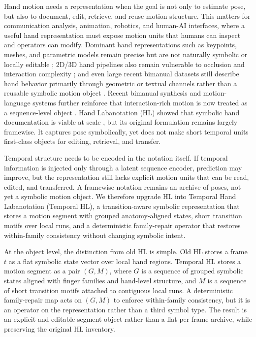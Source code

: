 \documentclass[letterpaper]{article}
\newcommand{\method}{Temporal Hand Labanotation}
\newcommand{\thl}{Temporal HL}
\begin{document}
Hand motion needs a representation when the goal is not only to estimate pose,
but also to document, edit, retrieve, and reuse motion structure. This matters
for communication analysis, animation, robotics, and human-AI interfaces, where
a useful hand representation must expose motion units that humans can inspect
and operators can modify. Dominant hand representations such as keypoints, meshes, and
parametric models remain precise but are not naturally symbolic or locally
editable \citep{romero2017mano}; 2D/3D hand pipelines also remain vulnerable to
occlusion and interaction complexity \citep{cao2021openpose, moon2020interhand};
and even large recent bimanual datasets still describe hand behavior primarily
through geometric or textual channels rather than a reusable symbolic motion
object \citep{fu2025gigahands}. Recent bimanual synthesis and motion-language
systems further reinforce that interaction-rich motion is now treated as a
sequence-level object \citep{chen2025language, zhang2025bimart}. Hand
Labanotation (HL) showed that symbolic hand documentation is viable at scale
\citep{li2024hl}, but its original formulation remains largely framewise. It
captures pose symbolically, yet does not make short temporal units first-class
objects for editing, retrieval, and transfer.

Temporal structure needs to be encoded in the notation itself. If
temporal information is injected only through a latent sequence encoder,
prediction may improve, but the representation still lacks explicit motion units
that can be read, edited, and transferred. A framewise notation remains an
archive of poses, not yet a symbolic motion object. We therefore upgrade HL into
\method{} (\thl{}), a transition-aware symbolic representation that stores a
motion segment with grouped anatomy-aligned states, short transition motifs over
local runs, and a deterministic family-repair operator that restores
within-family consistency without changing symbolic intent.

At the object level, the distinction from old HL is simple. Old HL stores a
frame $t$ as a flat symbolic state vector over local hand regions. \thl{}
stores a motion segment as a pair $(G, M)$, where $G$ is a sequence of grouped
symbolic states aligned with finger families and hand-level structure, and $M$
is a sequence of short transition motifs attached to contiguous local runs. A
deterministic family-repair map acts on $(G, M)$ to enforce within-family
consistency, but it is an operator on the representation rather than a third
symbol type. The result is an explicit and editable segment object rather than a
flat per-frame archive, while preserving the original HL inventory.
\end{document}
